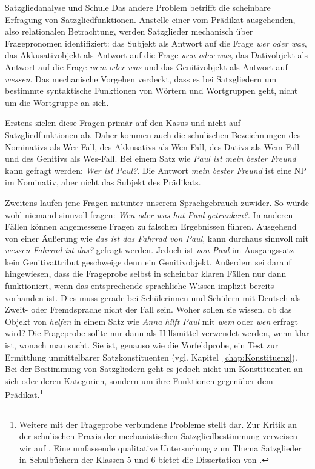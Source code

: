 \begin{Exkurs}{Satzgliedanalyse und Schule}
Das andere Problem betrifft die scheinbare Erfragung von Satzgliedfunktionen. Anstelle einer vom Prädikat ausgehenden, also relationalen Betrachtung, werden Satzglieder mechanisch über Fragepronomen identifiziert: das Subjekt als Antwort auf die Frage \textit{wer oder was}, das Akkusativobjekt als Antwort auf die Frage \textit{wen oder was}, das Dativobjekt als Antwort auf die Frage \textit{wem oder was} und das Genitivobjekt als Antwort auf \textit{wessen}. Das mechanische Vorgehen verdeckt, dass es bei Satzgliedern um bestimmte syntaktische Funktionen von Wörtern und Wortgruppen geht, nicht um die Wortgruppe an sich.

Erstens zielen diese Fragen primär auf den Kasus und nicht auf Satzgliedfunktionen ab. Daher kommen auch die schulischen Bezeichnungen des Nominativs als Wer-Fall, des Akkusativs als Wen-Fall, des Dativs als Wem-Fall und des Genitivs als Wes-Fall. Bei einem Satz wie \textit{Paul ist mein bester Freund} kann gefragt werden: \textit{Wer ist Paul?}. Die Antwort \textit{mein bester Freund} ist eine NP im Nominativ, aber nicht das Subjekt des Prädikats.  

Zweitens laufen jene Fragen mitunter unserem Sprachgebrauch zuwider. So würde wohl niemand sinnvoll fragen: \textit{Wen oder was hat Paul getrunken?}. In anderen Fällen können angemessene Fragen zu falschen Ergebnissen führen. Ausgehend von einer Äußerung wie \textit{das ist das Fahrrad von Paul}, kann durchaus sinnvoll mit \textit{wessen Fahrrad ist das?} gefragt werden. Jedoch ist \textit{von Paul} im Ausgangssatz kein Genitivattribut geschweige denn ein Genitivobjekt. Außerdem sei darauf hingewiesen, dass die Frageprobe selbst in scheinbar klaren Fällen nur dann funktioniert, wenn das entsprechende sprachliche Wissen implizit bereits vorhanden ist. Dies muss gerade bei Schülerinnen und Schülern mit Deutsch als Zweit- oder Fremdsprache nicht der Fall sein. Woher sollen sie wissen, ob das Objekt von \textit{helfen} in einem Satz wie \textit{Anna hilft Paul} mit \textit{wem} oder \textit{wen} erfragt wird? Die Frageprobe sollte nur dann als Hilfsmittel verwendet werden, wenn klar ist, wonach man sucht. Sie ist, genauso wie die Vorfeldprobe, ein Test zur Ermittlung unmittelbarer Satzkonstituenten (vgl. Kapitel~\ref{chap:Konstituenz}). Bei der Bestimmung von Satzgliedern geht es jedoch nicht um Konstituenten an sich oder deren Kategorien, sondern um ihre Funktionen gegenüber dem Prädikat.\footnote{Weitere mit der Frageprobe verbundene Probleme stellt \citet{Granzow-Emden2006} dar. Zur Kritik an der schulischen Praxis der mechanistischen Satzgliedbestimmung verweisen wir auf \citet[127--133]{Hennig2011SGLingSchule}. Eine umfassende qualitative Untersuchung zum Thema Satzglieder in Schulbüchern der Klassen 5 und 6 bietet die Dissertation von \citet{Dyck2024}.}  


\end{Exkurs}
